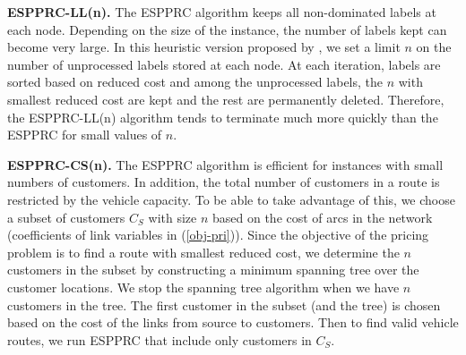 \documentclass[graybox]{./styles/svmult}
\begin{document}
{\bf ESPPRC-LL(n).} The ESPPRC algorithm keeps all non-dominated labels
at each node. Depending on the size of the instance, the number of labels 
kept can become very large. 
In this heuristic version proposed by \citet{Dumitrescu}, we set a limit $n$ on the number of
unprocessed labels stored at each node. At each iteration, labels are
sorted based on reduced cost and among the unprocessed labels, the
$n$ with smallest reduced cost are kept and the rest are permanently
deleted. Therefore, the ESPPRC-LL(n) algorithm tends to terminate much
more quickly than the ESPPRC for small values of $n$.

{\bf ESPPRC-CS(n).} The ESPPRC algorithm is efficient for instances
with small numbers of customers. In addition, the total number of
customers in a route is restricted by the vehicle capacity. To be able
to take advantage of this, we choose a subset of customers $C_S$ with
size $n$ based on the cost of arcs in the network 
(coefficients of link variables in (\ref{obj-pri})).  Since the
objective of the pricing problem is to find a route with smallest
reduced cost, we determine the $n$ customers in the subset by
constructing a minimum spanning tree over the customer locations. We stop
the spanning tree algorithm when we have $n$ customers in the tree.
The first customer in the subset (and the tree) is chosen based on the
cost of the links from source to customers. Then to find valid vehicle
routes, we run ESPPRC that include only customers in $C_S$.
\end{document}
